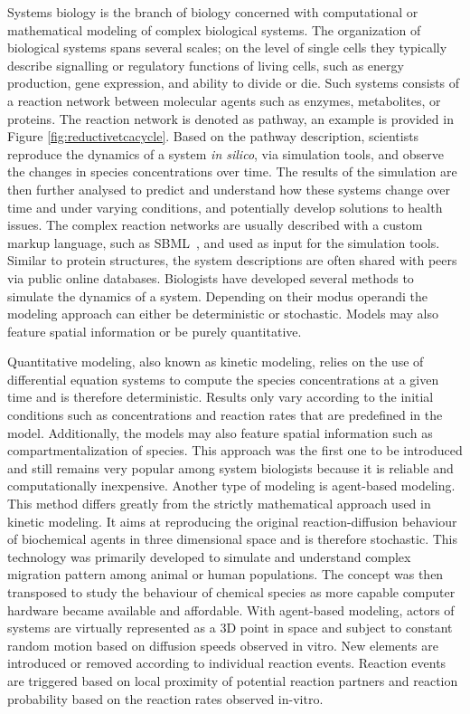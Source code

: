 Systems biology is the branch of biology concerned with computational or mathematical modeling of complex biological systems.
The organization of biological systems spans several scales; on the level of single cells they typically describe signalling or regulatory functions of living cells, such as energy production, gene expression, and ability to divide or die.
Such systems consists of a reaction network between molecular agents such as enzymes, metabolites, or proteins.
The reaction network is denoted as pathway, an example is provided in Figure \ref{fig:reductivetcacycle}.
Based on the pathway description, scientists reproduce the dynamics of a system \textit{in silico}, via simulation tools, and observe the changes in species concentrations over time.
The results of the simulation are then further analysed to predict and understand how these systems change over time and under varying conditions, and potentially develop solutions to health issues.
The complex reaction networks are usually described with a custom markup language, such as SBML~\cite{hucka2003systems}, and used as input for the simulation tools.
Similar to protein structures, the system descriptions are often shared with peers via public online databases.
Biologists have developed several methods to simulate the dynamics of a system.
Depending on their modus operandi the modeling approach can either be deterministic or stochastic.
Models may also feature spatial information or be purely quantitative. 

Quantitative modeling, also known as kinetic modeling, relies on the use of differential equation systems to compute the species concentrations at a given time and is therefore deterministic.
Results only vary according to the initial conditions such as concentrations and reaction rates that are predefined in the model.
Additionally, the models may also feature spatial information such as compartmentalization of species.
This approach was the first one to be introduced and still remains very popular among system biologists because it is reliable and computationally inexpensive.
Another type of modeling is agent-based modeling.
This method differs greatly from the strictly mathematical approach used in kinetic modeling.
It aims at reproducing the original reaction-diffusion behaviour of biochemical agents in three dimensional space and is therefore stochastic.
This technology was primarily developed to simulate and understand complex migration pattern among animal or human populations.
The concept was then transposed to study the behaviour of chemical species as more capable computer hardware became available and affordable.
With agent-based modeling, actors of systems are virtually represented as a 3D point in space and subject to constant random motion based on diffusion speeds observed in vitro.
New elements are introduced or removed according to individual reaction events.
Reaction events are triggered based on local proximity of potential reaction partners and reaction probability based on the reaction rates observed in-vitro.

